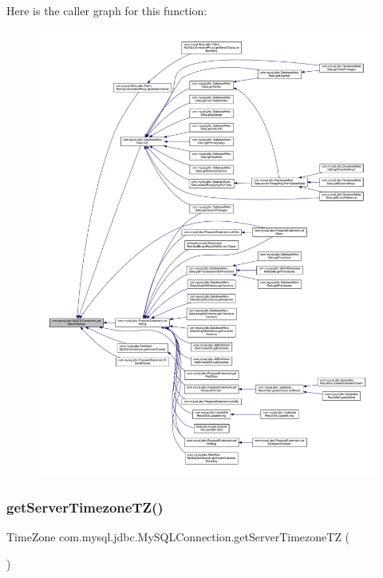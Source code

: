 Here is the caller graph for this function\+:
\nopagebreak
\begin{figure}[H]
\begin{center}
\leavevmode
\includegraphics[width=350pt]{interfacecom_1_1mysql_1_1jdbc_1_1_my_s_q_l_connection_a4f921d9cf354764fd1241cd56c0abecb_icgraph}
\end{center}
\end{figure}
\mbox{\label{interfacecom_1_1mysql_1_1jdbc_1_1_my_s_q_l_connection_a28586f911062106cb730733427568fc7}} 
\subsubsection{\texorpdfstring{get\+Server\+Timezone\+T\+Z()}{getServerTimezoneTZ()}}
{\footnotesize\ttfamily Time\+Zone com.\+mysql.\+jdbc.\+My\+S\+Q\+L\+Connection.\+get\+Server\+Timezone\+TZ (\begin{DoxyParamCaption}{ }\end{DoxyParamCaption})}

